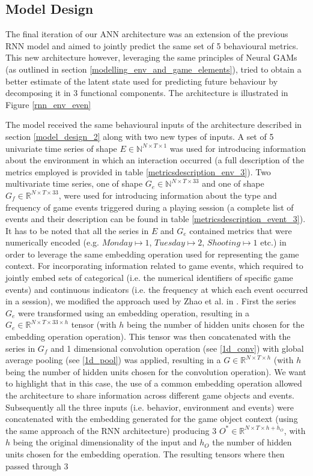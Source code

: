 \subsection{Model Design}
\label{model_design_3}
The final iteration of our ANN architecture was an extension of the previous RNN model and aimed to jointly predict the same set of 5 behavioural metrics. This new architecture however, leveraging the same principles of Neural GAMs (as outlined in section \ref{modelling_env_and_game_elements}), tried to obtain a better estimate of the latent state used for predicting future behaviour by decomposing it in 3 functional components. The architecture is illustrated in Figure \ref{rnn_env_even}

The model received the same behavioural inputs of the architecture described in section \ref{model_design_2} along with two new types of inputs. A set of 5 univariate time series of shape $E \in \mathbb{N}^{N \times T \times 1}$ was used for introducing information about the environment in which an interaction occurred (a full description of the metrics employed is provided in table \ref{metricsdescription_env_3}). Two multivariate time series, one of shape $G_e \in \mathbb{N}^{N \times T \times 33}$  and one of shape $G_f \in \mathbb{R}^{N \times T \times 33}$, were used for introducing information about the type and frequency of game events triggered during a playing session (a complete list of events and their description can be found in table \ref{metricsdescription_event_3}). It has to be noted that all the series in $E$ and $G_e$ contained metrics that were numerically encoded (e.g. $Monday \mapsto 1$, $Tuesday \mapsto 2$, $Shooting \mapsto 1$ etc.) in order to leverage the same embedding operation used for representing the game context. For incorporating information related to game events, which required to jointly embed sets of categorical (i.e. the numerical identifiers of specific game events) and continuous indicators (i.e. the frequency at which each event occurred in a session), we modified the approach used by Zhao et al. in \cite{zhao2020multi}. First the series $G_e$ were transformed using an embedding operation, resulting in a  $G_e  \in \mathbb{R}^{N \times T \times 33 \times h}$ tensor (with $h$ being the number of hidden units chosen for the embedding operation operation). This tensor was then concatenated with the series in $G_f$ and 1 dimensional convolution operation (see \ref{1d_conv}) with global average pooling (see \ref{1d_pool}) was applied, resulting in a $G  \in \mathbb{R}^{N \times T \times h}$ (with $h$ being the number of hidden units chosen for the convolution operation). We want to highlight that in this case, the use of a common embedding operation allowed the architecture to share information across different game objects and events. Subsequently all the three inputs (i.e. behavior, environment and events) were concatenated with the embedding generated for the game object context (using the same approach of the RNN architecture) producing 3 $O^*  \in \mathbb{R}^{N \times T \times h + h_O}$, with $h$ being the original dimensionality of the input and $h_O$ the number of hidden units chosen for the embedding operation. The resulting tensors where then passed through 3 